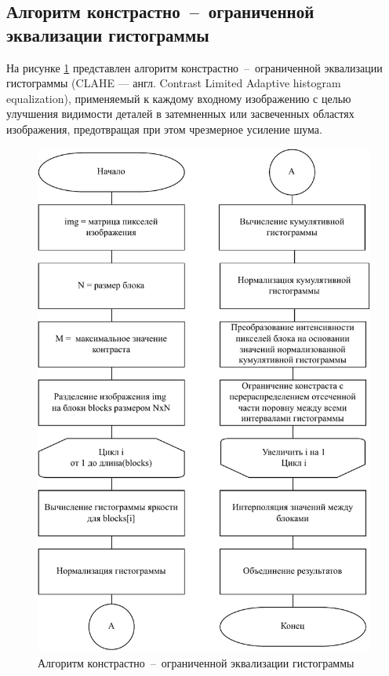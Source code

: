 \subsection{Алгоритм констрастно~--~ограниченной эквализации гистограммы}

На рисунке \ref{clahe} представлен алгоритм констрастно~--~ограниченной эквализации гистограммы (CLAHE --- англ. Contrast Limited Adaptive histogram equalization), применяемый к каждому входному изображению с целью улучшения видимости деталей в затемненных или засвеченных областях изображения, предотвращая при этом чрезмерное усиление шума.

\begin{figure}[H]
    \centering
    \includegraphics[scale=0.9]{assets/clahe}
    \caption{Алгоритм констрастно~--~ограниченной эквализации гистограммы}
    \label{clahe}
\end{figure}

